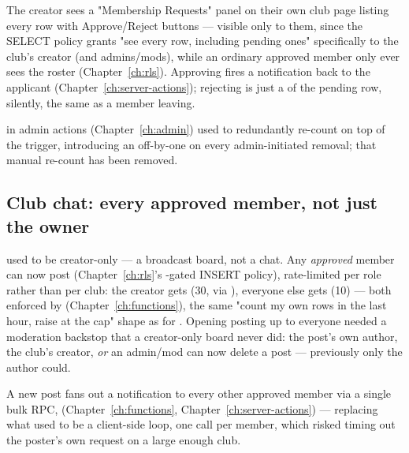 The creator sees a "Membership Requests" panel on their own club page listing every  row with Approve/Reject buttons — visible only to them, since the  SELECT policy grants "see every row, including pending ones" specifically to the club's creator (and admins/mods), while an ordinary approved member only ever sees the  roster (Chapter~\ref{ch:rls}). Approving fires a  notification back to the applicant (Chapter~\ref{ch:server-actions}); rejecting is just a  of the pending row, silently, the same as a member leaving.

\begin{olknote}
 in admin actions (Chapter~\ref{ch:admin}) used to redundantly re-count on top of the trigger, introducing an off-by-one on every admin-initiated removal; that manual re-count has been removed.
\end{olknote}

\subsection*{Club chat: every approved member, not just the owner}

 used to be creator-only — a broadcast board, not a chat. Any \emph{approved} member can now post (Chapter~\ref{ch:rls}'s -gated INSERT policy), rate-limited per role rather than per club: the creator gets  (30, via ), everyone else gets  (10) — both enforced by  (Chapter~\ref{ch:functions}), the same "count my own rows in the last hour, raise  at the cap" shape as  for . Opening posting up to everyone needed a moderation backstop that a creator-only board never did: the post's own author, the club's creator, \emph{or} an admin/mod can now delete a post — previously only the author could.

A new post fans out a notification to every other approved member via a single bulk RPC,  (Chapter~\ref{ch:functions}, Chapter~\ref{ch:server-actions}) — replacing what used to be a client-side loop, one  call per member, which risked timing out the poster's own request on a large enough club.

